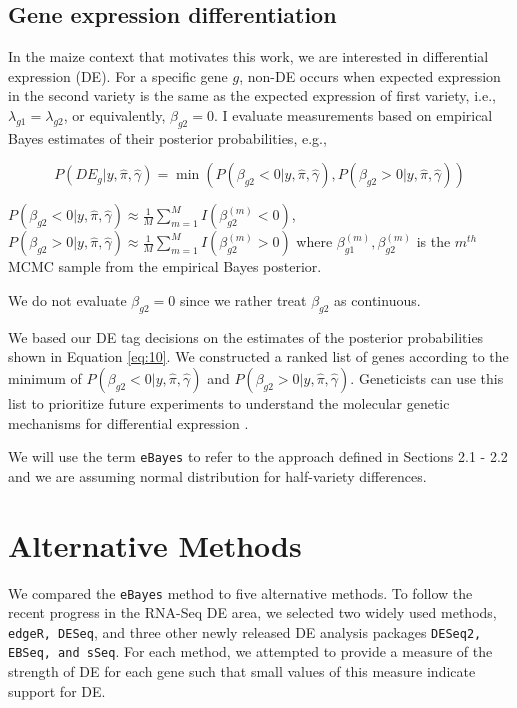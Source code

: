 \subsection{Gene expression differentiation}

In the maize context that motivates this work, we are interested in differential expression (DE). For a specific gene $g$, non-DE occurs when expected expression in the second variety is the same as the expected expression of first variety, i.e., $\lambda_{g1} = \lambda_{g2}$, or equivalently, $\beta_{g2}=0$.  I evaluate measurements based on empirical Bayes estimates of their posterior probabilities, e.g., 

\begin{equation}
\label{eq:10}
P(DE_g | y, \hat{\pi}, \hat{\gamma}) =\min( P(\beta_{g2}< 0 | y, \hat{\pi}, \hat{\gamma}),  P(\beta_{g2}> 0 | y, \hat{\pi}, \hat{\gamma}))
\end{equation}

$P(\beta_{g2}< 0 | y, \hat{\pi}, \hat{\gamma}) \approx \frac{1}{M} \sum_{m=1}^M I(\beta_{g2} ^ {(m)} < 0)$, $P(\beta_{g2}> 0 | y, \hat{\pi}, \hat{\gamma}) \approx \frac{1}{M} \sum_{m=1}^M I(\beta_{g2} ^ {(m)} > 0) $
where $\beta_{g1}^{(m)}, \beta_{g2}^{(m)}$ is the $m^{th}$ MCMC sample from the empirical Bayes posterior.

We do not evaluate $\beta_{g2}=0$ since we rather treat $\beta_{g2}$ as continuous. 

We based our DE tag decisions on the estimates of the posterior probabilities shown in Equation \eqref{eq:10}. We constructed a ranked list of genes according to the minimum of $P(\beta_{g2}< 0 | y, \hat{\pi}, \hat{\gamma})$ and $P(\beta_{g2}> 0 | y, \hat{\pi}, \hat{\gamma})$. Geneticists can use this list to prioritize future experiments to understand the molecular genetic mechanisms for differential expression \citep{niemi2015empirical}. 

We will use the term \texttt{eBayes} to refer to the approach defined in Sections 2.1 - 2.2 and we are assuming normal distribution for half-variety differences.

\section{Alternative Methods}

We compared the \texttt{eBayes} method to five alternative methods. To follow the recent progress in the RNA-Seq DE area, we selected two widely used methods, {\tt edgeR, DESeq}, and three other newly released DE analysis packages {\tt DESeq2, EBSeq, and sSeq}. For each method, we attempted to provide a measure of the strength of DE for each gene such that small values of this measure indicate support for DE. 

